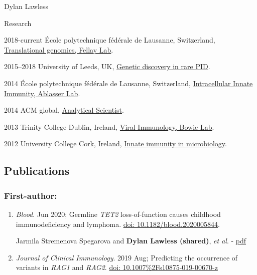 \documentclass[12pt,a4paper]{article}
\begin{document}
\begin{cv}{Dylan Lawless}
\begin{cvlist}{Research}
\item [2018-current]  \'Ecole polytechnique f\'ed\'erale de Lausanne, Switzerland, 
	\href{https://fellay-lab.epfl.ch}{Translational genomics, Fellay Lab}.
\item [2015--2018] University of Leeds, UK, \href{https://medicinehealth.leeds.ac.uk/homepage/160/leeds_institute_of_medical_research_at_st_jamess}{Genetic discovery in rare PID}.
\item [2014]  \'Ecole polytechnique f\'ed\'erale de Lausanne, Switzerland, 
	\href{https://www.epfl.ch/labs/ablasserlab/}{Intracellular Innate Immunity, Ablasser Lab}.
\item[2014] ACM global, 
	\href{http://www.acmgloballab.com}{Analytical Scientist}.
\item [2013] Trinity College Dublin, Ireland, 
	\href{https://www.tcd.ie/Biochemistry/research/bowie/}{Viral Immunology, Bowie Lab}.
\item [2012] University College Cork, Ireland, 
	\href{https://www.ucc.ie/en/microbiology/}{Innate immunity in microbiology}.

\end{cvlist}


\subsection*{Publications}
\subsubsection*{First-author:}
\begin{enumerate}

\item \emph{Blood}. Jun 2020; 
Germline \textit{TET2} loss-of-function causes childhood immunodeficiency and lymphoma.
\href{https://ashpublications.org/blood/article-abstract/136/9/1055/460739/Germline-TET2-loss-of-function-causes-childhood?redirectedFrom=fulltext}{doi: 10.1182/blood.2020005844}.

Jarmila Stremenova Spegarova and \textbf{Dylan Lawless (shared)},  \textit{et al}.
- \href{https://dylanlawless.github.io/resume/pdf/2020BloodSpegarovaLawless_Germline\%20TET2\%20loss\%20of\%20function\%20causes\%20childhood\%20immunodeficiency\%20and\%20lymphoma.pdf}{pdf}

\item \emph{Journal of Clinical Immunology}. 2019 Aug;
Predicting the occurrence of variants in \textit{RAG1} and \textit{RAG2}. 
\href{https://link.springer.com/article/10.1007\%2Fs10875-019-00670-z}{doi: 10.1007\%2Fs10875-019-00670-z}


\end{enumerate}
\end{cv}
\end{document}
